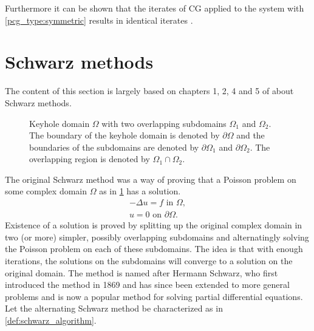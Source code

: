 Furthermore it can be shown that the iterates of CG applied to the system with \ref{pcg_type:symmetric} results in identical iterates \cite[Algorithm 9.2]{iter_method_saad}.

\section{Schwarz methods}\label{sec:schwarz_methods}
The content of this section is largely based on chapters 1, 2, 4 and 5 of \cite{schwarz_methods_Dolean_2015} about Schwarz methods.
\begin{figure}[H]
  \centering
  
  \caption{Keyhole domain $\Omega$ with two overlapping subdomains $\Omega_1$ and $\Omega_2$. The boundary of the keyhole domain is denoted by $\partial\Omega$ and the boundaries of the subdomains are denoted by $\partial\Omega_1$ and $\partial\Omega_2$. The overlapping region is denoted by $\Omega_1 \cap \Omega_2$.}
  \label{fig:keyhole_domain}
\end{figure}
The original Schwarz method was a way of proving that a Poisson problem on some complex domain $\Omega$ as in \cref{fig:keyhole_domain} has a solution.
\begin{equation}
  \begin{array}{c}
    -\Delta u = f \text{ in } \Omega, \\
    u = 0 \text{ on } \partial \Omega.
  \end{array}
  \label{eq:poisson_problem}
\end{equation}
Existence of a solution is proved by splitting up the original complex domain in two (or more) simpler, possibly overlapping subdomains and alternatingly solving the Poisson problem on each of these subdomains. The idea is that with enough iterations, the solutions on the subdomains will converge to a solution on the original domain. The method is named after Hermann Schwarz, who first introduced the method in 1869 \cite{og_schwarz_method_Schwarz} and has since been extended to more general problems and is now a popular method for solving partial differential equations. Let the alternating Schwarz method be characterized as in \cref{def:schwarz_algorithm}.

